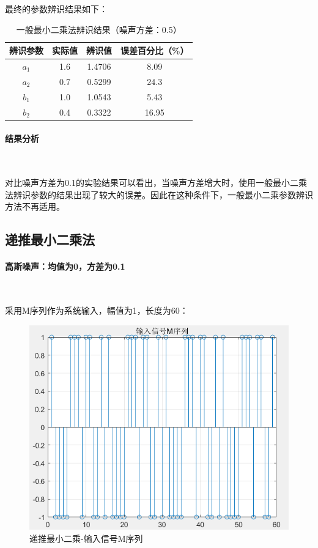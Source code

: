 \documentclass[UTF8]{article}
\begin{document}
最终的参数辨识结果如下：
\begin{table}[H]
\centering %
\begin{tabular}{cccc} %
    \toprule %
    辨识参数 & 实际值 & 辨识值 & 误差百分比（\%） \\
    \midrule %
    $a_1$ & 1.6 & 1.4706 & 8.09 \\
    $a_2$ & 0.7 & 0.5299 & 24.3 \\
    $b_1$ & 1.0 & 1.0543 & 5.43 \\
    $b_2$ & 0.4 & 0.3322 & 16.95 \\
    \bottomrule %
\end{tabular}
\caption{一般最小二乘法辨识结果（噪声方差：0.5）} %
\end{table}

\paragraph{结果分析}~{}

对比噪声方差为0.1的实验结果可以看出，当噪声方差增大时，使用一般最小二乘法辨识参数的结果出现了较大的误差。因此在这种条件下，一般最小二乘参数辨识方法不再适用。

\subsection{递推最小二乘法}
\paragraph{高斯噪声：均值为0，方差为0.1}~{}

采用M序列作为系统输入，幅值为1，长度为60：
\begin{figure}[H]
    \centering %
    \includegraphics[width=.8\textwidth]{figure/递推最小二乘-输入信号M序列.png} 
    \caption{递推最小二乘-输入信号M序列} %
\end{figure}
\end{document}
